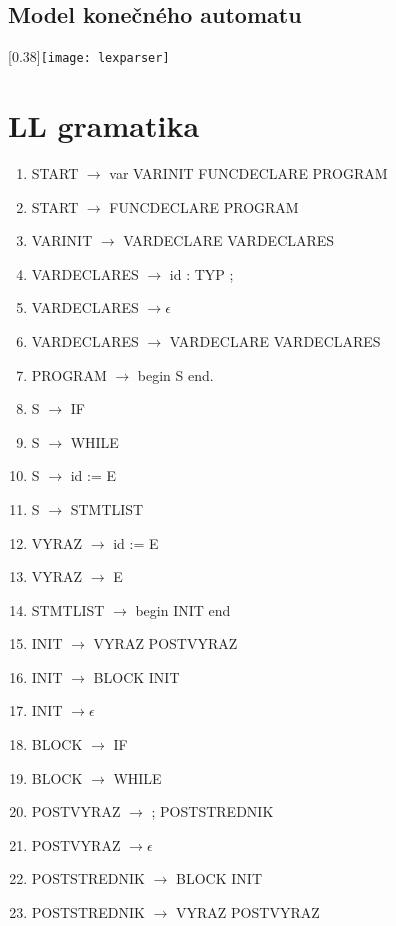 \documentclass[a4paper]{article}
\begin{document}
\clearpage
\begin{landscape}
\section{Model konečného automatu}
\scalebox{0.40}[0.38]{\texttt{[image: lexparser]}}
\end{landscape}
\clearpage

\newpage
\section{LL gramatika}
\begin{enumerate}
\item{START $\rightarrow $ var VARINIT FUNCDECLARE PROGRAM}
\item{START $\rightarrow $ FUNCDECLARE PROGRAM}
\item{VARINIT $\rightarrow $ VARDECLARE VARDECLARES } 
\item{VARDECLARES $\rightarrow $ id : TYP ; } 
\item{VARDECLARES $\rightarrow \epsilon$ } 
\item{VARDECLARES $\rightarrow$ VARDECLARE VARDECLARES } 
\item{PROGRAM $\rightarrow$ begin S end. } 
\item{S $\rightarrow$ IF } 
\item{S $\rightarrow$ WHILE } 
\item{S $\rightarrow$ id := E } 
\item{S $\rightarrow$ STMTLIST } 
\item{VYRAZ $\rightarrow$ id := E } 
\item{VYRAZ $\rightarrow$ E } 
\item{STMTLIST $\rightarrow$ begin INIT end } 
\item{INIT $\rightarrow$ VYRAZ POSTVYRAZ } 
\item{INIT $\rightarrow$ BLOCK INIT } 
\item{INIT $\rightarrow \epsilon$ } 
\item{BLOCK $\rightarrow$ IF } 
\item{BLOCK $\rightarrow$ WHILE }  
\item{POSTVYRAZ $\rightarrow$ ; POSTSTREDNIK } 
\item{POSTVYRAZ $\rightarrow \epsilon$  } 
\item{POSTSTREDNIK $\rightarrow$ BLOCK INIT } 
\item{POSTSTREDNIK $\rightarrow$ VYRAZ POSTVYRAZ } 

\end{enumerate}
\end{document}
